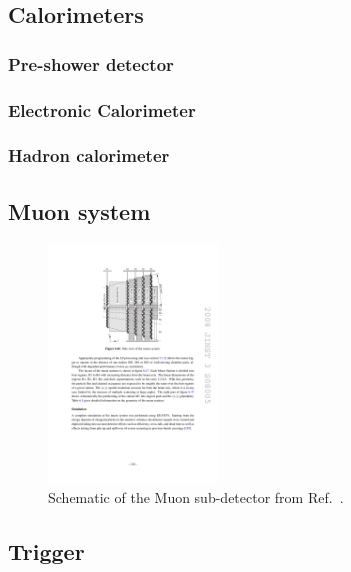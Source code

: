 \subsection{Calorimeters}
\subsubsection{Pre-shower detector}
\subsubsection{Electronic Calorimeter}
\subsubsection{Hadron calorimeter}
\subsection{Muon system}

\begin{figure}[!h]
    \centering
    \includegraphics[width=0.4\textwidth]{figs/Detector/muon_layout.pdf}
    \caption{Schematic of the Muon sub-detector from Ref.~\cite{Alves:2008zz}.}
    \label{fig:Dec_lhcb_layout}   
\end{figure}

\subsection{Trigger}
\subsubsection{\lone}
\subsubsection{\hltone}
